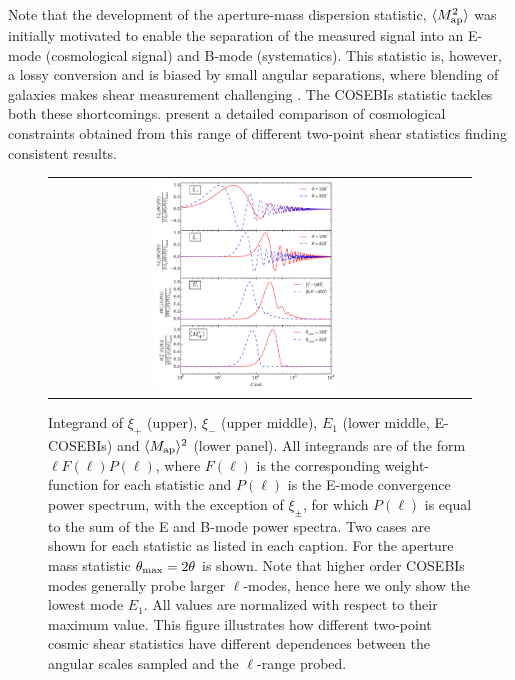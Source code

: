 Note that the development of the aperture-mass dispersion statistic, $\langle
M_ {\rm ap}^2 \rangle$ was initially motivated to enable the separation of the
measured signal into an E-mode (cosmological signal) and B-mode (systematics).
This statistic is, however, a lossy conversion and is biased by small angular
separations, where blending of galaxies makes shear measurement challenging
\citep{KSE06}. The COSEBIs statistic tackles both these shortcomings.
\citet{CFHTLenS-2pt-notomo} present a detailed comparison of cosmological
constraints obtained from this range of different two-point shear statistics
finding consistent results.

\begin{figure}%
\begin{center}
\begin{tabular}{ccc}
\includegraphics[width=0.48\textwidth]{figures/IntegAll.pdf} \\
\end{tabular}
\caption{\small{\label{fig:filters} 
Integrand of $\xi_+$ (upper), $\xi_-$
(upper middle), $E_1$ (lower middle, E-COSEBIs) and $\langle M_{\rm ap}
\rangle^2$ (lower panel). All integrands are of the form $\ell F(\ell)
P(\ell)$, where $F(\ell)$ is the corresponding weight-function for each
statistic and $P(\ell)$ is the E-mode convergence power spectrum, with the
exception of $\xi_\pm$, for which $P(\ell)$ is equal to the sum of the E and
B-mode power spectra. Two cases are shown for each statistic as listed in each
caption. For the aperture mass statistic $\theta_{\rm max}=2\theta$ is shown.
Note that higher order COSEBIs modes generally probe larger $\ell$-modes, hence
here we only show the lowest mode $E_1$. All values are normalized with respect
to their maximum value. This figure illustrates how different two-point cosmic shear
statistics have different dependences between the angular scales sampled and the $\ell$-range probed. }}
\end{center}
\end{figure}

